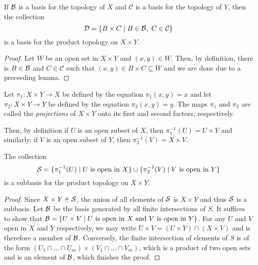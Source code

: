 \begin{proposition}
    If $\B$ is a basis for the topology of $X$ and $\mathcal{C}$ is a basis for the topology of $Y$, then the collection 
    \begin{equation*}
        \mathcal{D} = \{B\times C\mid B\in\B,~C\in\mathcal{C}\}
    \end{equation*}
    is a basis for the product topology on $X\times Y$.
\end{proposition}
\begin{proof}
    Let $W$ be an open set in $X\times Y$ and $(x,y)\in W$. Then, by definition, there is $B\in\B$ and $C\in\mathcal{C}$ such that $(x,y)\in B\times C\subseteq W$ and we are done due to a preceeding lemma.
\end{proof}

\begin{definition}
    Let $\pi_1:X\times Y\to X$ be defined by the equation $\pi_1(x,y) = x$ and let $\pi_2:X\times Y\to Y$ be defined by the equation $\pi_2(x,y) = y$. The maps $\pi_1$ and $\pi_2$ are called the \textit{projections} of $X\times Y$ onto its first and second factors, respectively.
\end{definition}

Then, by definition if $U$ is an open subset of $X$, then $\pi_1^{-1}(U) = U\times Y$ and similarly, if $V$ is an open subset of $Y$, then $\pi_2^{-1}(V) = X\times V$.

\begin{proposition}
    The collection 
    \begin{equation*}
        \S = \{\pi_1^{-1}(U)\mid \text{$U$ is open in $X$}\}\cup\{\pi_2^{-1}(V)\mid\text{$V$ is open in $Y$}\}
    \end{equation*}
    is a subbasis for the product topology on $X\times Y$.
\end{proposition}
\begin{proof}
    Since $X\times Y\in\S$, the union of all elements of $\S$ is $X\times Y$ and thus $\S$ is a subbasis. Let $\B$ be the basis generated by all finite intersections of $S$. It suffices to show that $\B = \{U\times V\mid\text{$U$ is open in $X$ and $V$ is open in $Y$}\}$. For any $U$ and $V$ open in $X$ and $Y$ respectively, we may write $U\times V = (U\times Y)\cap(X\times V)$ and is therefore a member of $\B$. Conversely, the finite intersection of elements of $S$ is of the form $(U_1\cap\ldots\cap U_m)\times(V_1\cap\ldots\cap V_m)$, which is a product of two open sets and is an element of $\B$, which finishes the proof.
\end{proof}


